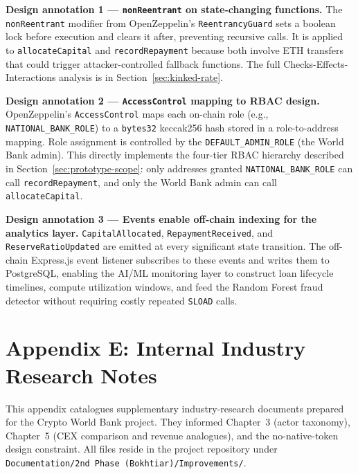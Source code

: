 \documentclass[12pt,a4paper]{report}
\begin{document}
\textbf{Design annotation 1 --- \texttt{nonReentrant} on state-changing functions.}
The \texttt{nonReentrant} modifier from OpenZeppelin's \texttt{ReentrancyGuard} sets a boolean lock before execution and clears it after, preventing recursive calls. It is applied to \texttt{allocateCapital} and \texttt{recordRepayment} because both involve ETH transfers that could trigger attacker-controlled fallback functions. The full Checks-Effects-Interactions analysis is in Section~\ref{sec:kinked-rate}.

\textbf{Design annotation 2 --- \texttt{AccessControl} mapping to RBAC design.}
OpenZeppelin's \texttt{AccessControl} maps each on-chain role (e.g., \texttt{NATIONAL\_BANK\_ROLE}) to a \texttt{bytes32} keccak256 hash stored in a role-to-address mapping. Role assignment is controlled by the \texttt{DEFAULT\_ADMIN\_ROLE} (the World Bank admin). This directly implements the four-tier RBAC hierarchy described in Section~\ref{sec:prototype-scope}: only addresses granted \texttt{NATIONAL\_BANK\_ROLE} can call \texttt{recordRepayment}, and only the World Bank admin can call \texttt{allocateCapital}.

\textbf{Design annotation 3 --- Events enable off-chain indexing for the analytics layer.}
\texttt{CapitalAllocated}, \texttt{RepaymentReceived}, and \texttt{ReserveRatioUpdated} are emitted at every significant state transition. The off-chain Express.js event listener subscribes to these events and writes them to PostgreSQL, enabling the AI/ML monitoring layer to construct loan lifecycle timelines, compute utilization windows, and feed the Random Forest fraud detector without requiring costly repeated \texttt{SLOAD} calls.

\chapter*{Appendix E: Internal Industry Research Notes}
{}
\label{app:internal-research}

This appendix catalogues supplementary industry-research documents prepared for the Crypto World Bank project. They informed Chapter~3 (actor taxonomy), Chapter~5 (CEX comparison and revenue analogues), and the no-native-token design constraint. All files reside in the project repository under \texttt{Documentation/2nd Phase (Bokhtiar)/Improvements/}.
\end{document}
